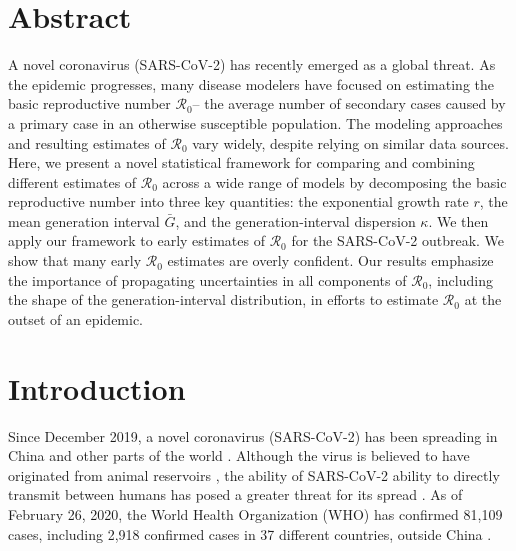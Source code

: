 \documentclass[12pt]{article}
\newcommand{\Ro}{\ensuremath{{\mathcal R}_{0}}\xspace}
\begin{document}
\section*{Abstract}
A novel coronavirus (SARS-CoV-2) has recently emerged as a global threat. 
As the epidemic progresses, many disease modelers have focused on estimating the basic reproductive number \Ro -- the average number of secondary cases caused by a primary case in an otherwise susceptible population.
The modeling approaches and resulting estimates of \Ro vary widely, despite relying on similar data sources.
Here, we present a novel statistical framework for comparing and combining different estimates of \Ro across a wide range of models by decomposing the basic reproductive number into three key quantities: the exponential growth rate $r$, the mean generation interval $\bar G$, and the generation-interval dispersion $\kappa$.
We then apply our framework to early estimates of \Ro for the SARS-CoV-2 outbreak.
We show that many early \Ro estimates are overly confident.
Our results emphasize the importance of propagating uncertainties in all components of \Ro, including the shape of the generation-interval distribution, in efforts to estimate \Ro at the outset of an epidemic.

\pagebreak

\section{Introduction}

Since December 2019, a novel coronavirus (SARS-CoV-2) has been spreading in China and other parts of the world \citep{pneumonia}.
Although the virus is believed to have originated from animal reservoirs \citep{cdcncov}, the ability of SARS-CoV-2 ability to directly transmit between humans has posed a greater threat for its spread \citep{huang2020clinical,who26report}.
As of February 26, 2020, the World Health Organization (WHO) has confirmed 81,109 cases, including 2,918 confirmed cases in 37 different countries, outside China \citep{who37report}.
\end{document}
